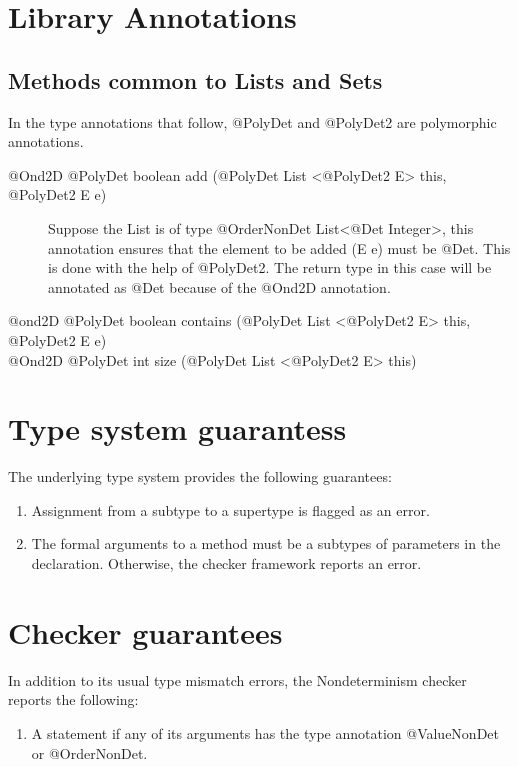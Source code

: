\section{Library Annotations\label{library-Annotations}}
\subsection{Methods common to Lists and Sets\label{lib-methods}}
In the type annotations that follow, @PolyDet and @PolyDet2 are polymorphic annotations.
\begin{description}
	\item[@Ond2D @PolyDet  boolean add (@PolyDet List <@PolyDet2 E> this, @PolyDet2 E e)] Suppose the List is of
	type @OrderNonDet List<@Det Integer>, this annotation ensures that the element to be added (E e) must be @Det. This is
	done with the help of @PolyDet2. The return type in this case will be annotated as @Det because of the @Ond2D annotation.
	\item[@ond2D @PolyDet  boolean contains (@PolyDet List <@PolyDet2 E> this, @PolyDet2 E e)]
	\item[@Ond2D @PolyDet int size (@PolyDet List <@PolyDet2 E> this)]
\end{description}

\section{Type system guarantess\label{type-system-guarantees}}
The underlying type system provides the following guarantees:
\begin{enumerate}
	\item Assignment from a subtype to a supertype is flagged as an error.
	\item The formal arguments to a method must be a subtypes of parameters in the declaration. Otherwise, the checker framework reports an error.
\end{enumerate}

\section{Checker guarantees\label{error-reporting}}
In addition to its usual type mismatch errors, the Nondeterminism checker reports the following:
\begin{enumerate}
	\item A  statement if any of its arguments has the type annotation @ValueNonDet or @OrderNonDet.
\end{enumerate}